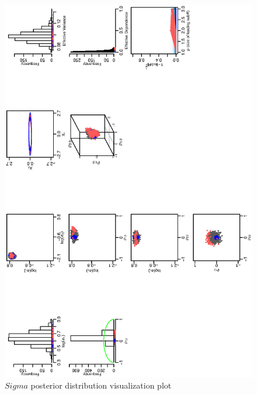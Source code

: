 \documentclass{article}
\begin{document}
\begin{figure}[h!]
\centering
\includegraphics[scale=.6, angle=-90]{var_hhql.ps}
\caption{$Sigma$ posterior distribution visualization plot}
\end{figure} 
\end{document}
